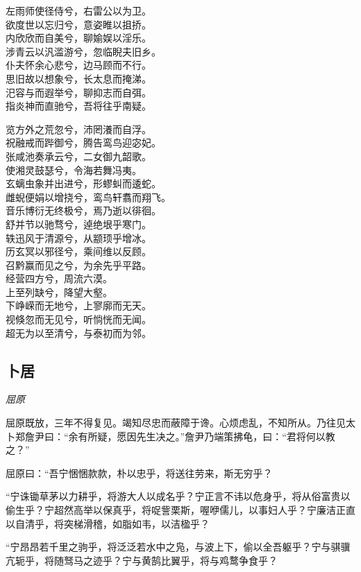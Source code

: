 \documentclass[]{article}
\begin{document}
左雨师使径侍兮，右雷公以为卫。\\
欲度世以忘归兮，意姿睢以抯挢。\\
内欣欣而自美兮，聊媮娱以淫乐。\\
涉青云以汎滥游兮，忽临睨夫旧乡。\\
仆夫怀余心悲兮，边马顾而不行。\\
思旧故以想象兮，长太息而掩涕。\\
汜容与而遐举兮，聊抑志而自弭。\\
指炎神而直驰兮，吾将往乎南疑。

览方外之荒忽兮，沛罔瀁而自浮。\\
祝融戒而跸御兮，腾告鸾鸟迎宓妃。\\
张咸池奏承云兮，二女御九韶歌。\\
使湘灵鼓瑟兮，令海若舞冯夷。\\
玄螭虫象并出进兮，形蟉虯而逶蛇。\\
雌蜺便娟以增挠兮，鸾鸟轩翥而翔飞。\\
音乐博衍无终极兮，焉乃逝以徘徊。\\
舒并节以驰骛兮，逴绝垠乎寒门。\\
轶迅风于清源兮，从颛顼乎增冰。\\
历玄冥以邪径兮，乘间维以反顾。\\
召黔赢而见之兮，为余先乎平路。\\
经营四方兮，周流六漠。\\
上至列缺兮，降望大壑。\\
下峥嵘而无地兮，上寥廓而无天。\\
视倏忽而无见兮，听惝恍而无闻。\\
超无为以至清兮，与泰初而为邻。

\hypertarget{header-n2898}{%
\subsection{卜居}\label{header-n2898}}

\emph{屈原}

屈原既放，三年不得复见。竭知尽忠而蔽障于谗。心烦虑乱，不知所从。乃往见太卜郑詹尹曰：``余有所疑，愿因先生决之。''詹尹乃端策拂龟，曰：``君将何以教之？''

屈原曰：``吾宁悃悃款款，朴以忠乎，将送往劳来，斯无穷乎？

``宁诛锄草茅以力耕乎，将游大人以成名乎？宁正言不讳以危身乎，将从俗富贵以偷生乎？宁超然高举以保真乎，将哫訾栗斯，喔咿儒儿，以事妇人乎？宁廉洁正直以自清乎，将突梯滑稽，如脂如韦，以洁楹乎？

``宁昂昂若千里之驹乎，将泛泛若水中之凫，与波上下，偷以全吾躯乎？宁与骐骥亢轭乎，将随驽马之迹乎？宁与黄鹄比翼乎，将与鸡鹜争食乎？
\end{document}
